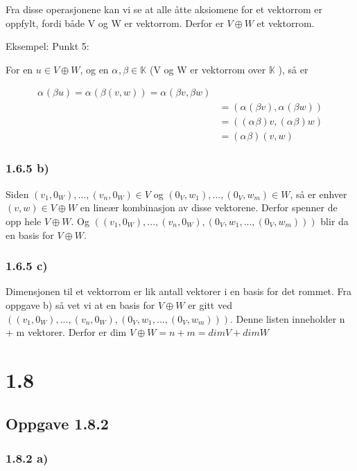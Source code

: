 \documentclass[11pt]{article}
\begin{document}
Fra disse operasjonene kan vi se at alle åtte aksiomene for et vektorrom er oppfylt, fordi både V og W er vektorrom. Derfor er $ V \oplus W $ et vektorrom.


Eksempel: Punkt 5:


For en $ u \in V \oplus W $, og en $ \alpha_{}^{} , \beta \in \mathbb{K} $ (V og W er vektorrom over $ \mathbb{K} $ ), så er 

\begin{align*}
    \alpha_{}^{} (\beta u) = \alpha_{}^{} (\beta (v, w)) = \alpha_{}^{} (\beta v, \beta w) \\
    &= (\alpha_{}^{} (\beta v), \alpha_{}^{} (\beta w)) \\
    &= ((\alpha_{}^{} \beta) v, (\alpha_{}^{} \beta) w) \\
    &= (\alpha_{}^{} \beta)(v, w)
\end{align*}

\subsubsection{1.6.5 b)}


Siden $ (v_1, 0_W), ... , (v_n, 0_W) \in V $ og $ (0_V, w_1), ... , (0_V, w_m) \in W$, så er enhver $ (v, w) \in V \oplus W $ en lineær kombinasjon av disse vektorene. Derfor spenner de opp hele $ V \oplus W $. Og $ ((v_1, 0_W), ..., (v_n, 0_W), (0_V, w_1, ..., (0_V, w_m))) $ blir da en basis for $ V \oplus W $.    


\subsubsection{1.6.5 c)}

Dimensjonen til et vektorrom er lik antall vektorer i en basis for det rommet. Fra oppgave b) så vet vi at en basis for $ V \oplus W $ er gitt ved $ ((v_1, 0_W), ..., (v_n, 0_W), (0_V, w_1, ..., (0_V, w_m))) $. Denne listen inneholder n + m vektorer. Derfor er dim $ V \oplus W = n + m = dim V + dim W $


\section{1.8}

\subsection{Oppgave 1.8.2}

\subsubsection{1.8.2 a)}
\end{document}
